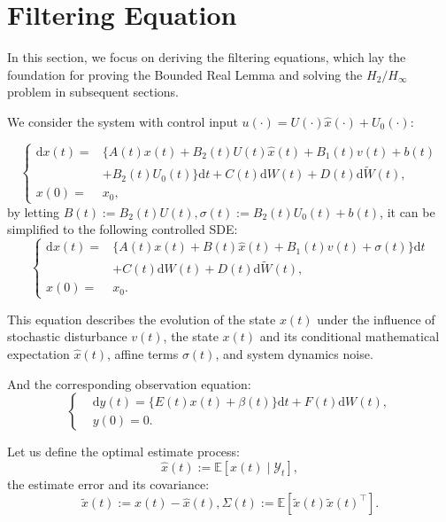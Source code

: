 \documentclass[lettersize,journal]{IEEEtran}
\theoremstyle{plain}
\theoremstyle{definition}
\begin{document}
\section{Filtering Equation}\label{sec3}
In this section, we focus on deriving the filtering equations, which lay the foundation for proving the Bounded Real Lemma and solving the $H_2/H_\infty$ problem in subsequent sections.

We consider the system with control input $u(\cdot) = U(\cdot)\widehat{x}(\cdot) + U_0(\cdot)$:

\begin{equation*}
	\left\{
	\begin{aligned}
		\mathrm{d}x(t) =& \Big\{ A(t)x(t) + B_2(t)U(t)\widehat{x}(t) + B_1(t)v(t) + b(t)\\
		& + B_2(t)U_0(t) \Big\} \mathrm{d}t + C(t)\mathrm{d}W(t) + D(t)\mathrm{d}\widetilde{W}(t),\\
		x(0)=&x_0,
	\end{aligned}
	\right.
\end{equation*}
by letting $B(t) := B_2(t)U(t), \sigma(t) := B_2(t)U_0(t) + b(t)$, it can be simplified to the following controlled SDE:
\begin{equation} \label{eq:3.1}
	\left\{
	\begin{aligned}
		\mathrm{d}x(t) =& \Big\{ A(t)x(t) + B(t)\widehat{x}(t) + B_1(t)v(t) +\sigma(t) \Big\} \mathrm{d}t\\
		& + C(t)\mathrm{d}W(t) + D(t)\mathrm{d}\widetilde{W}(t),\\
		x(0)=&x_0.
	\end{aligned}
	\right.
\end{equation}

This equation describes the evolution of the state $x(t)$ under the influence of stochastic disturbance $v(t)$, the state $x(t)$ and its conditional mathematical expectation $\widehat{x}(t)$, affine terms $\sigma(t)$, and system dynamics noise.

And the corresponding observation equation:
\begin{equation}\label{eq:3.2}
	\left\{
	\begin{aligned}
		& \mathrm{d}y(t) = \Big\{ E(t)x(t) + \beta(t) \Big\}\mathrm{d}t + F(t)\mathrm{d}W(t),\\
		& y(0) = 0.
	\end{aligned}
	\right.
\end{equation}

Let us define the optimal estimate process:
\[ 
\widehat{x}(t) := \mathbb{E}[x(t) \mid \mathcal{Y}_t],
\]
the estimate error and its covariance:
\[
\widetilde{x}(t) := x(t) - \widehat{x}(t),\Sigma(t) := \mathbb{E}[\widetilde{x}(t)\widetilde{x}(t)^{\top}].
\]
\end{document}
